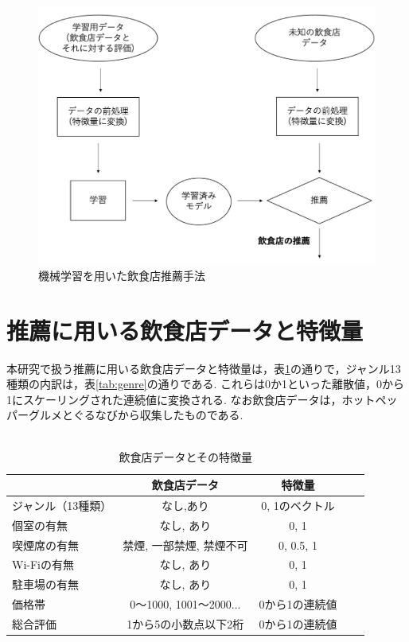 \documentclass[12pt,a4j]{jreport}
\begin{document}
\begin{figure}[htbp]
  \begin{center}
    \includegraphics[width=13cm]{image/fig1.png}
    \caption{機械学習を用いた飲食店推薦手法}
    \label{fig1}
  \end{center}
\end{figure}

\section{推薦に用いる飲食店データと特徴量}
本研究で扱う推薦に用いる飲食店データと特徴量は，表\ref{tab:feature_values}の通りで，ジャンル13種類の内訳は，表\ref{tab:genre}の通りである.
これらは0か1といった離散値，0から1にスケーリングされた連続値に変換される.
なお飲食店データは，ホットペッパーグルメとぐるなびから収集したものである.\\\\

\begin{table}[htbp]
  \begin{center}
    \begin{tabular}{|l|c|c|c|c|}\hline
       & \textbf{飲食店データ} & \textbf{特徴量} \\ \hline
      ジャンル（13種類） & なし,あり & 0, 1のベクトル \\ \hline
      個室の有無 & なし, あり & 0, 1 \\ \hline
      喫煙席の有無 & 禁煙, 一部禁煙, 禁煙不可 & 0, 0.5, 1 \\ \hline
      Wi-Fiの有無 & なし, あり & 0, 1 \\ \hline
      駐車場の有無 & なし, あり & 0, 1 \\ \hline
      価格帯 & 0〜1000, 1001〜2000... & 0から1の連続値 \\ \hline
      総合評価 & 1から5の小数点以下2桁 & 0から1の連続値 \\ \hline
    \end{tabular}
  \end{center}
  \caption{飲食店データとその特徴量}
  \label{tab:feature_values}
\end{table}
\end{document}
